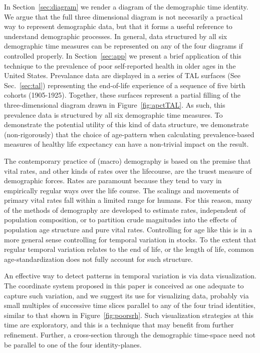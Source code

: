 \documentclass[12pt,oneside,a4paper]{article} %
\theoremstyle{definition}
\begin{document}
In Section~\ref{sec:diagram} we render a diagram of the demographic time
identity. We argue that the full three dimensional diagram is not necesarily a
practical way to represent demographic data, but that it forms a useful
reference to understand demographic processes. In general, data structured by
all six demographic time measures can be represented on any of the four diagrams
if controlled properly. In Section~\ref{sec:app} we present a brief
application of this technique to the prevalence of poor self-reported health in
older ages in the United States. Prevalance data are displayed in a series of
TAL surfaces (See Sec.~\ref{sec:tal}) representing the end-of-life experience of
a sequence of five birth cohorts (1905-1925). Together, these surfaces represent
a partial filling of the three-dimensional diagram drawn in
Figure~\ref{fig:apctTAL}. As such, this prevalence data is structured by all six
demographic time measures. To demonstrate the potential utility of this kind of
data structure, we demonstrate (non-rigorously) that the choice of
age-pattern when calculating prevalence-based measures of healthy
life expectancy can have a non-trivial impact on the result.

The contemporary practice of (macro) demography is based on the premise that
vital rates, and other kinds of rates over the lifecourse, are the truest measure of
demographic forces. Rates are paramount because they tend to vary in
empirically regular ways over the life course. The scalings and movements of
primary vital rates fall within a limited range for humans. For this reason, many of the methods of
demography are developed to estimate rates, independent of population composition, or to
partition crude magnitudes into the effects of population age structure and
pure vital rates. Controlling for age like this is in a more general sense
controlling for temporal variation in stocks. To the extent that regular temporal variation
relates to the end of life, or the length of life, common
age-standardization does not fully account for such structure.

An effective way to detect patterns in temporal variation
is via data visualization. The coordinate system proposed in this paper is
conceived as one adequate to capture such variation, and we suggest its use
for visualizing data, probably via small multiples of successive time slices
parallel to any of the four triad identities, similar to that shown in
Figure~\ref{fig:poorsrh}.
Such visualization strategies at this time are exploratory, and this is a
technique that may benefit from further refinement. Further, a cross-section
through the demographic time-space need not be parallel to one of the four
identity-planes.
\end{document}
